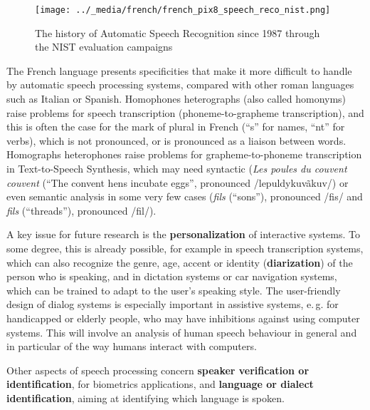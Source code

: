 \begin{multicols}{2}
\begin{figure}[!ht]
\begin{center}
  \texttt{[image: ../\_media/french/french\_pix8\_speech\_reco\_nist.png]}
  \caption{The history of Automatic Speech Recognition since 1987 through the NIST evaluation campaigns~\cite{speechreconist}}
  \label{fig:nistreco}
\end{center}
\end{figure}

The French language presents specificities that make it more difficult
to handle by automatic speech processing systems, compared with other
roman languages such as Italian or Spanish. Homophones heterographs
(also called homonyms) raise problems for speech transcription
(phoneme-to-grapheme transcription), and this is often the case for
the mark of plural in French (``s'' for names, ``nt'' for verbs), which is
not pronounced, or is pronounced as a liaison between
words. Homographs heterophones raise problems for grapheme-to-phoneme
transcription in Text-to-Speech Synthesis, which may need syntactic
({\em Les poules du couvent couvent} (``The convent hens incubate eggs'',
pronounced /lepuldykuvãkuv/) or even semantic analysis in some very
few cases ({\em fils} (``sons''), pronounced /fis/ and {\em fils} (``threads''),
pronounced /fil/).

A key issue for future research is the {\bf personalization} of interactive
systems. To some degree, this is already possible, for example in
speech transcription systems, which can also recognize the genre, age,
accent or identity ({\bf diarization}) of the person who is speaking, and in
dictation systems or car navigation systems, which can be trained to
adapt to the user's speaking style. The user-friendly design of dialog
systems is especially important in assistive systems, e.\,g. for
handicapped or elderly people, who may have inhibitions against using
computer systems. This will involve an analysis of human speech
behaviour in general and in particular of the way humans interact with
computers.

Other aspects of speech processing concern {\bf speaker verification or
identification}, for biometrics applications, and {\bf language or dialect
identification}, aiming at identifying which language is spoken.


\end{multicols}
